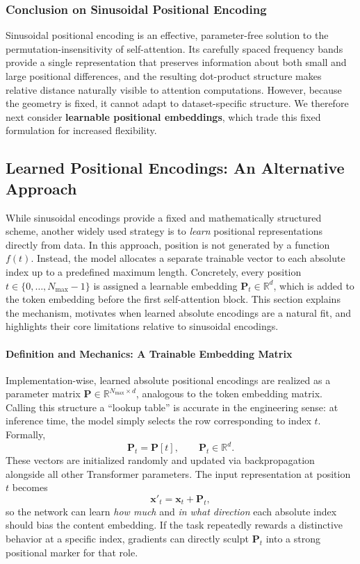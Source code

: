 \subsubsection{Conclusion on Sinusoidal Positional Encoding}
\noindent
Sinusoidal positional encoding is an effective, parameter-free solution to the permutation-insensitivity of self-attention.
Its carefully spaced frequency bands provide a single representation that preserves information about both small and large positional differences,
and the resulting dot-product structure makes relative distance naturally visible to attention computations.
However, because the geometry is fixed, it cannot adapt to dataset-specific structure.
We therefore next consider \textbf{learnable positional embeddings}, which trade this fixed formulation for increased flexibility.

\newpage

\subsection{Learned Positional Encodings: An Alternative Approach}
\label{subsec:chapter17_learned_pe}

\noindent
While sinusoidal encodings provide a fixed and mathematically structured scheme, another widely used strategy is to \emph{learn} positional representations directly from data.
In this approach, position is not generated by a function \(f(t)\).
Instead, the model allocates a separate trainable vector to each absolute index up to a predefined maximum length.
Concretely, every position
\(
t \in \{0,\dots,N_{\max}-1\}
\)
is assigned a learnable embedding
\(
\mathbf{P}_t \in \mathbb{R}^d
\),
which is added to the token embedding before the first self-attention block.
This section explains the mechanism, motivates when learned absolute encodings are a natural fit, and highlights their core limitations relative to sinusoidal encodings.

\paragraph{Definition and Mechanics: A Trainable Embedding Matrix}
\noindent
Implementation-wise, learned absolute positional encodings are realized as a parameter matrix
\(
\mathbf{P} \in \mathbb{R}^{N_{\max}\times d}
\),
analogous to the token embedding matrix.
Calling this structure a ``lookup table'' is accurate in the engineering sense:
at inference time, the model simply selects the row corresponding to index \(t\).
Formally,
\[
\mathbf{P}_t = \mathbf{P}[t],
\qquad
\mathbf{P}_t \in \mathbb{R}^d.
\]
These vectors are initialized randomly and updated via backpropagation alongside all other Transformer parameters.
The input representation at position \(t\) becomes
\[
\mathbf{x}'_t = \mathbf{x}_t + \mathbf{P}_t,
\]
so the network can learn \emph{how much} and \emph{in what direction} each absolute index should bias the content embedding.
If the task repeatedly rewards a distinctive behavior at a specific index, gradients can directly sculpt \(\mathbf{P}_t\) into a strong positional marker for that role.

